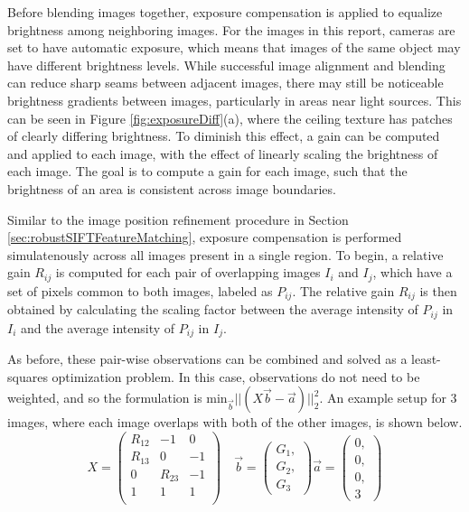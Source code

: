 \documentclass[]{spie}  %
\begin{document}
Before blending images together, exposure compensation is applied to
equalize brightness among neighboring images. For the images in this
report, cameras are set to have automatic exposure, which means that
images of the same object may have different brightness levels. While
successful image alignment and blending can reduce sharp seams between
adjacent images, there may still be noticeable brightness gradients
between images, particularly in areas near light sources. This can be
seen in Figure \ref{fig:exposureDiff}(a), where the ceiling texture
has patches of clearly differing brightness. To diminish this effect,
a gain can be computed and applied to each image, with the effect of
linearly scaling the brightness of each image. The goal is to compute
a gain for each image, such that the brightness of an area is
consistent across image boundaries.

Similar to the image position refinement procedure in Section
\ref{sec:robustSIFTFeatureMatching}, exposure compensation is
performed simulatenously across all images present in a single
region. To begin, a relative gain $R_{ij}$ is computed for each pair
of overlapping images $I_i$ and $I_j$, which have a set of pixels
common to both images, labeled as $P_{ij}$. The relative gain $R_{ij}$
is then obtained by calculating the scaling factor between the average
intensity of $P_{ij}$ in $I_i$ and the average intensity of $P_{ij}$
in $I_j$.

As before, these pair-wise observations can be combined and solved as
a least-squares optimization problem. In this case, observations do
not need to be weighted, and so the formulation is
$\textrm{min}_{\vec{b}} ||(X \vec{b} - \vec{a})||_2^2 $. An example
setup for 3 images, where each image overlaps with both of the other
images, is shown below.
\[
X =
\begin{pmatrix}
  R_{12} & -1 & 0\\
  R_{13} & 0 & -1\\
  0 & R_{23} & -1\\
  1 & 1 & 1\\

\end{pmatrix}\quad
\vec{b} =
\begin{pmatrix}
  G_1, \\ G_2, \\ G_3
\end{pmatrix}
\vec{a} =
\begin{pmatrix}
  0, \\ 0, \\ 0, \\ 3
\end{pmatrix}
\]
\end{document}
